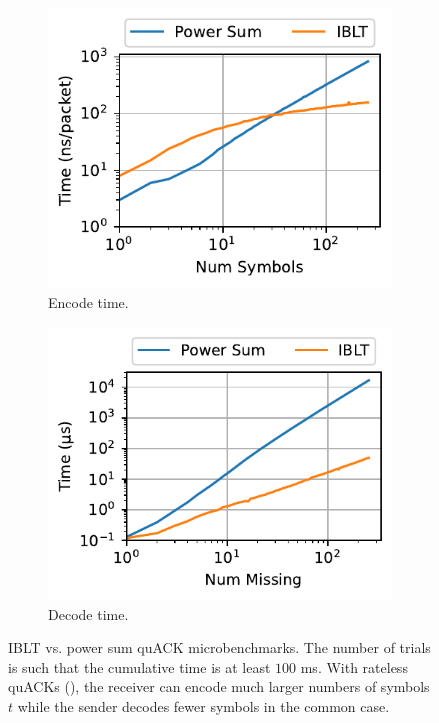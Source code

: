 \begin{figure}[t]
    \centering
    \begin{subfigure}[b]{0.49\linewidth}
        \centering
        \includegraphics[width=\linewidth]{quack/figures/quack_encode.pdf}
        \caption{Encode time.}
        \label{fig:quack:iblt-computation:encode}
    \end{subfigure}
    \begin{subfigure}[b]{0.49\linewidth}
        \centering
        \includegraphics[width=\linewidth]{quack/figures/quack_decode.pdf}
        \caption{Decode time.}
        \label{fig:quack:iblt-computation:decode}
    \end{subfigure}
    \caption{IBLT vs. power sum quACK microbenchmarks. The number of trials is
     such that the cumulative time is at least $100$ ms. With rateless quACKs
     (),
     the receiver can encode much larger numbers of symbols $t$ while the
     sender decodes fewer symbols in the common case.
     }
    \label{fig:quack:iblt-computation}
\end{figure}